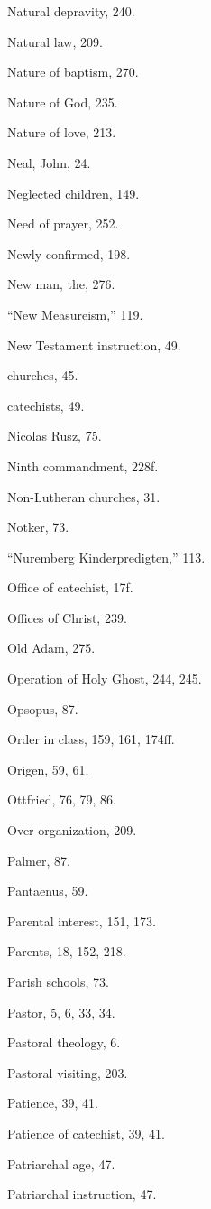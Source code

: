 \begin{originalinhalt}
Natural depravity, 240.

Natural law, 209.

Nature of baptism, 270.

Nature of God, 235.

Nature of love, 213.

Neal, John, 24.

Neglected children, 149.

Need of prayer, 252.

Newly confirmed, 198.

New man, the, 276.

“New Measureism,” 119.

New Testament instruction, 49.

churches, 45.

catechists, 49.

Nicolas Rusz, 75.

Ninth commandment, 228f.

Non-Lutheran churches, 31.

Notker, 73.

“Nuremberg Kinderpredigten,” 113.


Office of catechist, 17f.

Offices of Christ, 239.

Old Adam, 275.

Operation of Holy Ghost, 244, 245.

Opsopus, 87.

Order in class, 159, 161, 174ff.

Origen, 59, 61.

Ottfried, 76, 79, 86.

Over-organization, 209.


Palmer, 87.

Pantaenus, 59.

Parental interest, 151, 173.

Parents, 18, 152, 218.

Parish schools, 73.

Pastor, 5, 6, 33, 34.

Pastoral theology, 6.

Pastoral visiting, 203.

Patience, 39, 41.

Patience of catechist, 39, 41.

Patriarchal age, 47.

Patriarchal instruction, 47.


\end{originalinhalt}
